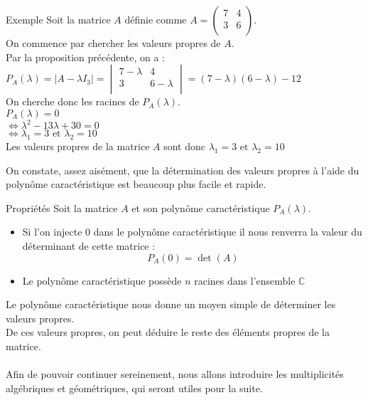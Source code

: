 \begin{bclogo}[logo=\bccrayon,noborder=true,barre=snake]{Exemple}
Soit la matrice $A$ définie comme $A=\begin{pmatrix}
7 & 4 \\
3 & 6 \\
\end{pmatrix}$.\\
On commence par chercher les valeurs propres de $A$.\\
Par la proposition précédente, on a :\\
$P_A(\lambda) = | A-\lambda I_3 | =\begin{vmatrix}
7 - \lambda & 4\\
3 & 6- \lambda \\
\end{vmatrix} = (7-\lambda)(6-\lambda) -12$\\
On cherche donc les racines de $P_A(\lambda)$.\\
$P_A(\lambda)=0$\\
$\Leftrightarrow {\lambda}^{2}-13\lambda +30 =0$\\
$\Leftrightarrow {\lambda}_{1}=3 \text{ et } {\lambda}_{2}=10$\\

Les valeurs propres de la matrice $A$ sont donc ${\lambda}_{1}=3 \text{ et } {\lambda}_{2}=10$
\end{bclogo}
On constate, assez aisément, que la détermination des valeurs propres à l'aide du polynôme caractéristique est beaucoup plus facile et rapide.
\begin{bclogo}[couleur=red!30,couleurBord=red,ombre=true,arrondi=0.1,logo=\bcoutil]{Propriétés}
Soit la matrice $A$ et son polynôme caractéristique $P_A(\lambda)$.
\begin{itemize}
\item Si l'on injecte $0$ dans le polynôme caractéristique il nous renverra la valeur du déterminant de cette matrice :\
$$P_A(0)=\det(A)$$
\item Le polynôme caractéristique possède $n$ racines dans l'ensemble $\mathbb{C}$
\end{itemize}
\end{bclogo}

Le polynôme caractéristique nous donne un moyen simple de déterminer les valeurs propres.\\
De ces valeurs propres, on peut déduire le reste des éléments propres de la matrice.\\
\\
Afin de pouvoir continuer sereinement, nous allons introduire les multiplicités algébriques et géométriques, qui seront utiles pour la suite.

